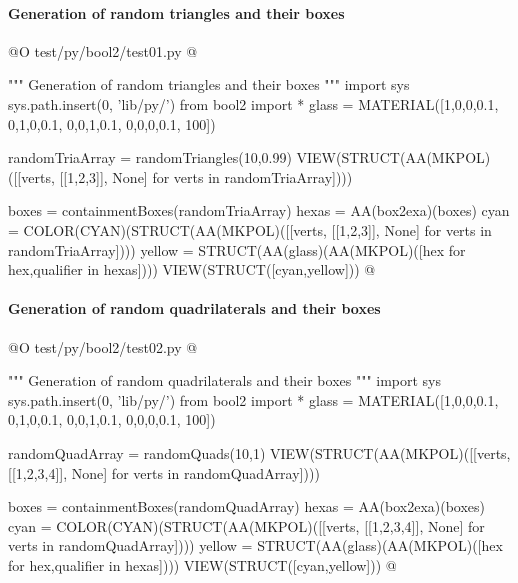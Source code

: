 \documentclass[11pt,oneside]{article}    %
\begin{document}
\paragraph{Generation of random triangles and their boxes}
@O test/py/bool2/test01.py
@{""" Generation of random triangles and their boxes """
import sys
sys.path.insert(0, 'lib/py/')
from bool2 import *
glass = MATERIAL([1,0,0,0.1,  0,1,0,0.1,  0,0,1,0.1, 0,0,0,0.1, 100])

randomTriaArray = randomTriangles(10,0.99)
VIEW(STRUCT(AA(MKPOL)([[verts, [[1,2,3]], None] for verts in randomTriaArray])))

boxes = containmentBoxes(randomTriaArray)
hexas = AA(box2exa)(boxes)
cyan = COLOR(CYAN)(STRUCT(AA(MKPOL)([[verts, [[1,2,3]], None] for verts in randomTriaArray])))
yellow = STRUCT(AA(glass)(AA(MKPOL)([hex for hex,qualifier in hexas])))
VIEW(STRUCT([cyan,yellow]))
@}


\paragraph{Generation of random quadrilaterals and their boxes}
@O test/py/bool2/test02.py
@{""" Generation of random quadrilaterals and their boxes """
import sys
sys.path.insert(0, 'lib/py/')
from bool2 import *
glass = MATERIAL([1,0,0,0.1,  0,1,0,0.1,  0,0,1,0.1, 0,0,0,0.1, 100])

randomQuadArray = randomQuads(10,1)
VIEW(STRUCT(AA(MKPOL)([[verts, [[1,2,3,4]], None] for verts in randomQuadArray])))

boxes = containmentBoxes(randomQuadArray)
hexas = AA(box2exa)(boxes)
cyan = COLOR(CYAN)(STRUCT(AA(MKPOL)([[verts, [[1,2,3,4]], None] for verts in randomQuadArray])))
yellow = STRUCT(AA(glass)(AA(MKPOL)([hex for hex,qualifier in hexas])))
VIEW(STRUCT([cyan,yellow]))
@}
\end{document}
